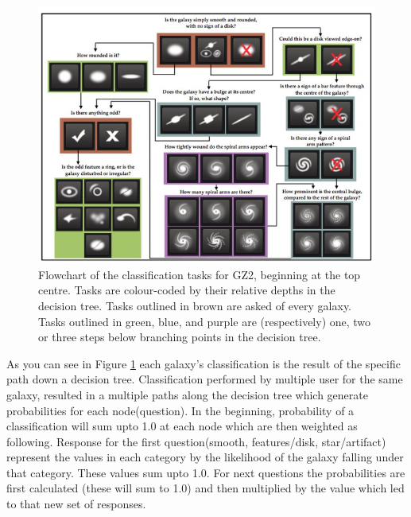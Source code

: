 \begin{figure}[h]
\centering
\includegraphics[scale=0.9]{figures/decision_tree.jpg}
\caption{Flowchart of the classification tasks for GZ2, beginning at the top centre. Tasks are colour-coded by their relative depths in the decision tree. Tasks outlined in brown are asked of every galaxy. Tasks outlined in green, blue, and purple are (respectively) one, two or three steps below branching points in the decision tree\cite{galaxyzoo2}.}
\label{decision_tree}
\end{figure}


As you can see in Figure \ref{decision_tree} each galaxy's classification is the result of the specific path down a decision tree. Classification performed by multiple user for the same galaxy, resulted in a multiple paths along the decision tree which generate probabilities for each node(question). In the beginning, probability of a classification will sum upto 1.0 at each node which are then weighted as following\cite{kaggledata}. Response for the first question(smooth, features/disk, star/artifact) represent the values in each category by the likelihood of the galaxy falling under that category. These values sum upto 1.0. For next questions the probabilities are first calculated (these will sum to 1.0) and then multiplied by the value which led to that new set of responses.   
